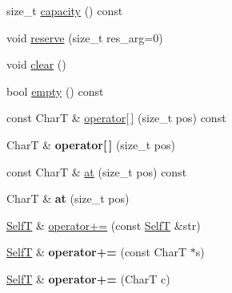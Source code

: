 \begin{CompactItemize}
\item 
size\_\-t \hyperlink{classdeque__string_37b3b4d907d9f7a5230c23583e88880a}{capacity} () const 
\item 
void \hyperlink{classdeque__string_932f3e6441fcbee5538163dd6d621ea6}{reserve} (size\_\-t res\_\-arg=0)
\item 
void \hyperlink{classdeque__string_4ee86cce5b0bdf35309bcdf0e1cee4e5}{clear} ()
\item 
bool \hyperlink{classdeque__string_9a087a5f4703f941694db606591f373c}{empty} () const 
\item 
const CharT \& \hyperlink{classdeque__string_88832ed720e934d637d0b8b9205e29a5}{operator\mbox{[}$\,$\mbox{]}} (size\_\-t pos) const 
\item 
\hypertarget{classdeque__string_8ae1e564151c672194b465fd39c89082}{
CharT \& \textbf{operator\mbox{[}$\,$\mbox{]}} (size\_\-t pos)}
\label{classdeque__string_8ae1e564151c672194b465fd39c89082}

\item 
const CharT \& \hyperlink{classdeque__string_54e0631a4ddc10a3213bb32209798f39}{at} (size\_\-t pos) const 
\item 
\hypertarget{classdeque__string_8db7a050d7969669651de3ef0081f7f3}{
CharT \& \textbf{at} (size\_\-t pos)}
\label{classdeque__string_8db7a050d7969669651de3ef0081f7f3}

\item 
\hyperlink{classdeque__string}{SelfT} \& \hyperlink{classdeque__string_be047cca197538745a78f73347fbdfb1}{operator+=} (const \hyperlink{classdeque__string}{SelfT} \&str)
\item 
\hypertarget{classdeque__string_7b1039a5eedbf0648f16bc59f1348d00}{
\hyperlink{classdeque__string}{SelfT} \& \textbf{operator+=} (const CharT $\ast$s)}
\label{classdeque__string_7b1039a5eedbf0648f16bc59f1348d00}

\item 
\hypertarget{classdeque__string_b70e12292860c87d07f20addad600dd1}{
\hyperlink{classdeque__string}{SelfT} \& \textbf{operator+=} (CharT c)}
\label{classdeque__string_b70e12292860c87d07f20addad600dd1}


\end{CompactItemize}
